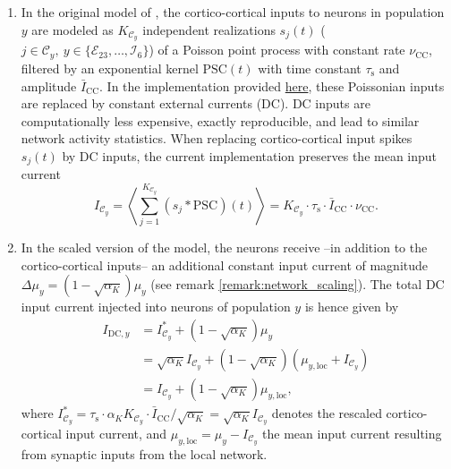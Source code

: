 \documentclass[10pt,a4paper,twoside,american]{article}
\theoremstyle{definitionstyle}
\newcommand{\tauS}{\tau_\text{s}}
\begin{document}
\begin{appendices}
\begin{enumerate}
\item \label{remark:cortico_cortical_dc}
  In the original model of \citet{Potjans14}, the cortico-cortical inputs to neurons in population $y$ are modeled as $K_{\mathcal{C}_y}$ independent realizations $s_j(t)$ ($j\in\mathcal{C}_y,\ y\in \{\mathcal{E}_{23},\ldots,\mathcal{I}_{6}\}$) of a Poisson point process with constant rate $\nu_\text{CC}$, filtered by an exponential kernel $\text{PSC}(t)$ with time constant $\tauS$ and amplitude $\bar{I}_\text{CC}$.   
  In the implementation provided \href{https://github.com/INM-6/microcircuit-PD14-model}{here}, these Poissonian inputs are replaced by constant external currents (DC).
  DC inputs are computationally less expensive, exactly reproducible, and lead to similar network activity statistics.
  When replacing cortico-cortical input spikes $s_j(t)$ by DC inputs, the current implementation preserves the mean input current
  \begin{equation}
    I_{\mathcal{C}_y}
    = \left\langle \sum_{j=1}^{K_{\mathcal{C}_y}} \left(s_j*\text{PSC}\right)(t) \right\rangle
    = K_{\mathcal{C}_y} \cdot \tauS \cdot \bar{I}_\text{CC} \cdot \nu_\text{CC} .
  \end{equation}
\item \label{remark:dc_scaling_constraints}
  In the scaled version of the model, the neurons receive --in addition to the cortico-cortical inputs-- an additional constant input current of magnitude $\Delta\mu_y = ( 1 - \sqrt{\alpha_K}) \mu_y$ (see remark \ref{remark:network_scaling}).
  The total DC input current injected into neurons of population $y$ is hence given by
  \begin{equation}
    \label{eq:dc_magnitude_rescaled}
    \begin{aligned}
    I_{\text{DC},y}
    & = I_{\mathcal{C}_y}^* + \left( 1 - \sqrt{\alpha_K} \right) \mu_y\\
    & = \sqrt{\alpha_K} I_{\mathcal{C}_y} + \left( 1 - \sqrt{\alpha_K} \right) \left( \mu_{y,\text{loc}} + I_{\mathcal{C}_y}\right) \\
    & = I_{\mathcal{C}_y} + \left( 1 - \sqrt{\alpha_K} \right) \mu_{y,\text{loc}}
    ,      
    \end{aligned}
  \end{equation}
  where $I_{\mathcal{C}_y}^* = \tauS \cdot \alpha_K K_{\mathcal{C}_y} \cdot \bar{I}_\text{CC}/\sqrt{\alpha_K} = \sqrt{\alpha_K} I_{\mathcal{C}_y}$ denotes the rescaled cortico-cortical input current, and  $\mu_{y,\text{loc}}=\mu_y - I_{\mathcal{C}_y}$ the mean input current resulting from synaptic inputs from the local network.

\end{enumerate}
\end{appendices}
\end{document}
